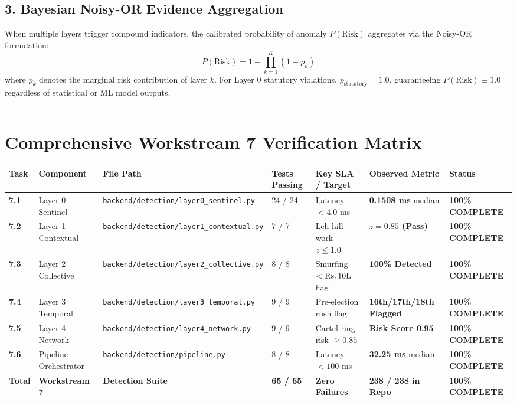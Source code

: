 \documentclass[11pt,a4paper]{article}
\begin{document}
\subsection{3. Bayesian Noisy-OR Evidence Aggregation}
When multiple layers trigger compound indicators, the calibrated probability of anomaly $P(\text{Risk})$ aggregates via the Noisy-OR formulation:
\[ P(\text{Risk}) = 1 - \prod_{k=1}^K \left( 1 - p_k \right) \]
where $p_k$ denotes the marginal risk contribution of layer $k$. For Layer 0 statutory violations, $p_{\text{statutory}} = 1.0$, guaranteeing $P(\text{Risk}) \equiv 1.0$ regardless of statistical or ML model outputs.

\vspace{1em}\hrule\vspace{1em}

\section{Comprehensive Workstream 7 Verification Matrix}

\begin{table}[htbp]
\centering
\small
\begin{tabularx}{\textwidth}{l l Y Y Y Y Y}
\toprule
\textbf{Task} & \textbf{Component} & \textbf{File Path} & \textbf{Tests Passing} & \textbf{Key SLA / Target} & \textbf{Observed Metric} & \textbf{Status} \\
\midrule
\textbf{7.1} & Layer 0 Sentinel & \texttt{backend/detection/layer0\_sentinel.py} & 24 / 24 & Latency $< 4.0$ ms & \textbf{0.1508 ms} median & \textbf{100\% COMPLETE} \\
\textbf{7.2} & Layer 1 Contextual & \texttt{backend/detection/layer1\_contextual.py} & 7 / 7 & Leh hill work $z \le 1.0$ & \textbf{$z = 0.85$ (Pass)} & \textbf{100\% COMPLETE} \\
\textbf{7.3} & Layer 2 Collective & \texttt{backend/detection/layer2\_collective.py} & 8 / 8 & Smurfing $< \text{Rs.\,}10\text{L}$ flag & \textbf{100\% Detected} & \textbf{100\% COMPLETE} \\
\textbf{7.4} & Layer 3 Temporal & \texttt{backend/detection/layer3\_temporal.py} & 9 / 9 & Pre-election rush flag & \textbf{16th/17th/18th Flagged} & \textbf{100\% COMPLETE} \\
\textbf{7.5} & Layer 4 Network & \texttt{backend/detection/layer4\_network.py} & 9 / 9 & Cartel ring risk $\ge 0.85$ & \textbf{Risk Score 0.95} & \textbf{100\% COMPLETE} \\
\textbf{7.6} & Pipeline Orchestrator & \texttt{backend/detection/pipeline.py} & 8 / 8 & Latency $< 100$ ms & \textbf{32.25 ms} median & \textbf{100\% COMPLETE} \\
\textbf{Total} & \textbf{Workstream 7} & \textbf{Detection Suite} & \textbf{65 / 65} & \textbf{Zero Failures} & \textbf{238 / 238 in Repo} & \textbf{100\% COMPLETE} \\
\bottomrule
\end{tabularx}
\end{table}
\end{document}

